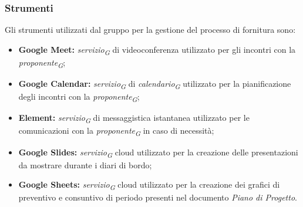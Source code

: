 \subsubsection{Strumenti}
Gli strumenti utilizzati dal gruppo per la gestione del processo di fornitura sono: 
\begin{itemize}
    \item \textbf{Google Meet:}
    \textit{servizio}\textsubscript{\textit{G}} di videoconferenza utilizzato per gli incontri con la \textit{proponente}\textsubscript{\textit{G}};
    \item \textbf{Google Calendar:}
    \textit{servizio}\textsubscript{\textit{G}} di \textit{calendario}\textsubscript{\textit{G}} utilizzato per la pianificazione degli incontri con la \textit{proponente}\textsubscript{\textit{G}};
    \item \textbf{Element:}
    \textit{servizio}\textsubscript{\textit{G}} di messaggistica istantanea utilizzato per le comunicazioni con la \textit{proponente}\textsubscript{\textit{G}} in caso di necessità;
    \item \textbf{Google Slides:}
    \textit{servizio}\textsubscript{\textit{G}} cloud utilizzato per la creazione delle presentazioni da mostrare durante i diari di bordo;
    \item \textbf{Google Sheets:} \textit{servizio}\textsubscript{\textit{G}} cloud utilizzato per la creazione dei grafici di preventivo e consuntivo di periodo presenti nel documento \textit{Piano di Progetto}.
\end{itemize}


